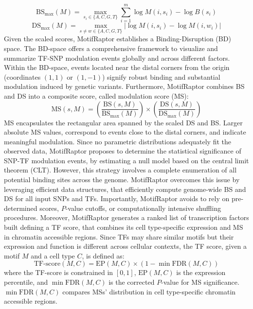 \documentclass[a4paper, titlepage, openright]{book}
\newcommand{\motifraptor}{MotifRaptor\xspace}
\begin{document}
\[
    \text{BS}_{\max}(M) = \max_{s_{i} \in \{A, C, G, T\}} \sum^{m}_{i=1}{\log{M(i,s_{i})}-\log{B(s_{i})}} 
\]
\[
    \text{DS}_{\max}(M) = \max_{s \neq w \in \{A, C, G, T\}}|\log{M(i, s_{i})} - \log{M(i, w_{i})}|
\]
Given the scaled scores, \motifraptor establishes a Binding-Disruption (BD) space. The BD-space offers a comprehensive framework to visualize and summarize TF-SNP modulation events globally and across different factors. Within the BD-space, events located near the distal corners from the origin (coordinates $(1,1)$ or $(1,−1)$) signify robust binding and substantial modulation induced by genetic variants. Furthermore, \motifraptor combines BS and DS into a composite score, called modulation score (MS):
\[
    \text{MS}(s, M) = \left(\frac{\text{BS}(s,M)}{\text{BS}_{\max}(M)}\right) \times \left(\frac{\text{DS}(s,M)}{\text{DS}_{\max}(M)}\right)
\]
MS encapsulates the rectangular area spanned by the scaled DS and BS. Larger absolute MS values, correspond to events close to the distal corners, and indicate meaningful modulation. Since no parametric distributions adequately fit the observed data, \motifraptor proposes to determine the statistical significance of SNP-TF modulation events, by estimating a null model based on the central limit theorem (CLT). However, this strategy involves a complete enumeration of all potential binding sites across the genome. \motifraptor overcomes this issue by leveraging efficient data structures, that efficiently compute genome-wide BS and DS for all input SNPs and TFs. Importantly, \motifraptor avoids to rely on pre-determined scores, $P$-value cutoffs, or computationally intensive shuffling procedures. Moreover, \motifraptor generates a ranked list of transcription factors built defining a TF score, that combines its cell type-specific expression and MS in chromatin accessible regions. Since TFs may share similar motifs but their expression and function is different across cellular contexts, the TF score, given a motif $M$ and a cell type $C$, is defined as:
\[
    \text{TF-score}(M,C) = \text{EP}(M,C) \times (1-\min{\text{FDR}(M,C)})
\] 
where the TF-score is constrained in $[0,1]$, $\text{EP}(M,C)$ is the expression percentile, and $\min{\text{FDR}(M,C)}$ is the corrected $P$-value for MS significance. $\min{\text{FDR}(M,C)}$  compares MSs' distribution in cell type-specific chromatin accessible regions.

\end{document}
